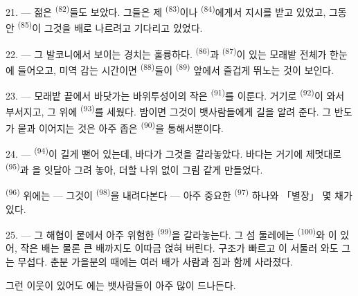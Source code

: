 21. --- 젊은  \textsuperscript{(82)}들도 보았다. 그들은 제 
\textsuperscript{(83)}이나  \textsuperscript{(84)}에게서 지시를 받고 있었고,
그동안  \textsuperscript{(85)}이 그것을 배로 나르려고 기다리고 있었다.

22. --- 그 발코니에서 보이는 경치는 훌륭하다.  \textsuperscript{(86)}과
 \textsuperscript{(87)}이 있는 모래밭 전체가 한눈에 들어오고, 미역 감는
시간이면  \textsuperscript{(88)}들이 
\textsuperscript{(89)} 앞에서 즐겁게 뛰노는 것이 보인다.

23. --- 모래밭 끝에서 바닷가는 바위투성이의 작은  \textsuperscript{(91)}를
이룬다. 거기로  \textsuperscript{(92)}이 와서 부서지고, 그 위에
 \textsuperscript{(93)}를 세웠다. 밤이면 그것이 뱃사람들에게 길을 알려 준다.
그 반도가 뭍과 이어지는 것은 아주 좁은  \textsuperscript{(90)}을
통해서뿐이다.

\VUsaut{3.0mm}
\VUsaut{3.0mm}

24. ---  \textsuperscript{(94)}이 길게 뻗어 있는데, 바다가 그것을 갈라놓았다.
바다는 거기에 제멋대로  \textsuperscript{(95)}과 을 잇달아 그려
놓아, 더할 나위 없이 그림 같게 만들었다.

 \textsuperscript{(96)} 위에는 — 그것이  \textsuperscript{(98)}을
내려다본다 — 아주 중요한  \textsuperscript{(97)} 하나와 「별장」 몇 채가 있다.

25. --- 그 해협이 뭍에서 아주 위험한  \textsuperscript{(99)}을 갈라놓는다. 그
섬 둘레에는  \textsuperscript{(100)}와 이 있어, 작은
배는 물론 큰 배까지도 이따금 얹혀 버린다. 구조가 빠르고 이 서둘러 와도
그 는 무섭다. 춘분 가을분의  때에는 여러 배가 사람과 짐과
함께 사라졌다.

그런 이웃이 있어도 에는 뱃사람들이 아주 많이 드나든다.

\VUsaut{6.0mm}
\VUfilet{22mm}
